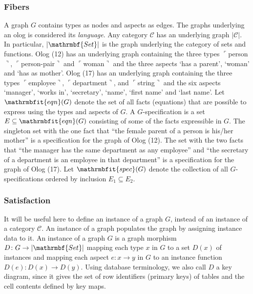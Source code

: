 \documentclass{amsart}
\def\to{\rightarrow}
\newcommand{\fakebox}[1]{\tn{$\ulcorner$#1$\urcorner$}}
\theoremstyle{remark}
\theoremstyle{definition}
\def\tn{\textnormal}
\begin{document}
\subsubsection{Fibers}\label{sec:fibers}

A graph $G$ contains types as nodes and aspects as edges.
The graphs underlying an olog is considered its {\em language}.
Any category $\mathcal{C}$ has an underlying graph $|\mathcal{C}|$.
In particular, 
$|\mathrmbf{Set}|$ is the graph underlying the category of sets and functions.
Olog (12) has an underlying graph containing the three types \fakebox{person}, \fakebox{person-pair} and \fakebox{woman} 
and the three aspects `has a parent', `woman' and `has as mother'.
Olog (17) has an underlying graph containing the three types \fakebox{employee}, \fakebox{department}, and \fakebox{string} 
and the six aspects `manager', `works in', `secretary', `name', `first name' and `last name'.
Let $\mathrmbfit{eqn}(G)$ denote the set of all facts (equations) 
that are possible to express using the types and aspects of $G$.
A $G$-specification
is a set $E \subseteq \mathrmbfit{eqn}(G)$ consisting of some of the facts expressible in $G$.
The singleton set with the one fact 
that ``the female parent of a person is his/her mother'' 
is a specification for the graph of Olog (12).
The set with the two facts 
that ``the manager has the same department as any employee'' 
and ``the secretary of a department is an employee in that department''
is a specification for the graph of Olog (17).
Let $\mathrmbfit{spec}(G)$ 
denote the collection of all $G$-specifications 
ordered by inclusion $E_{1} \subseteq E_{2}$.

\subsubsection{Satisfaction}

It will be useful here to define an instance of a graph $G$,
instead of an instance of a category $\mathcal{C}$.
An instance of a graph populates the graph by assigning instance data to it.
An instance of a graph $G$ is a graph morphism $D \colon G \to |\mathrmbf{Set}|$ 
mapping each type $x$ in $G$ to a set $D(x)$ of instances and
mapping each aspect $e \colon x \to y$ in $G$ to an instance function $D(e) \colon D(x) \to D(y)$.
Using database terminology,
we also call $D$ a key diagram,
since it gives the set of row identifiers (primary keys) of tables and the cell contents defined by key maps.
\end{document}
